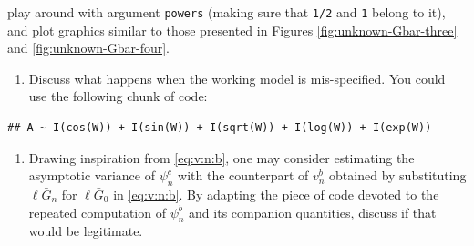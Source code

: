 \documentclass[]{article}
\newenvironment{Shaded}{\begin{snugshade}}{\end{snugshade}}
\newcommand{\ControlFlowTok}[1]{\textcolor[rgb]{0.13,0.29,0.53}{\textbf{#1}}}
\newcommand{\DataTypeTok}[1]{\textcolor[rgb]{0.13,0.29,0.53}{#1}}
\newcommand{\KeywordTok}[1]{\textcolor[rgb]{0.13,0.29,0.53}{\textbf{#1}}}
\newcommand{\NormalTok}[1]{#1}
\newcommand{\OperatorTok}[1]{\textcolor[rgb]{0.81,0.36,0.00}{\textbf{#1}}}
\newcommand{\OtherTok}[1]{\textcolor[rgb]{0.56,0.35,0.01}{#1}}
\newcommand{\StringTok}[1]{\textcolor[rgb]{0.31,0.60,0.02}{#1}}
\providecommand{\tightlist}{%
  \setlength{\itemsep}{0pt}\setlength{\parskip}{0pt}}
\newcommand{\Gbar}{\bar{G}}
\theoremstyle{definition}
\theoremstyle{definition}
\theoremstyle{definition}
\theoremstyle{remark}
\begin{document}
play around with argument \texttt{powers} (making sure that \texttt{1/2}
and \texttt{1} belong to it), and plot graphics similar to those
presented in Figures \ref{fig:unknown-Gbar-three} and
\ref{fig:unknown-Gbar-four}.

\begin{enumerate}
\def\labelenumi{\arabic{enumi}.}
\setcounter{enumi}{3}
\tightlist
\item
  Discuss what happens when the working model is mis-specified. You
  could use the following chunk of code:
\end{enumerate}

\begin{Shaded}
\end{Shaded}

\begin{verbatim}
## A ~ I(cos(W)) + I(sin(W)) + I(sqrt(W)) + I(log(W)) + I(exp(W))
\end{verbatim}

\begin{enumerate}
\def\labelenumi{\arabic{enumi}.}
\setcounter{enumi}{4}
\tightlist
\item
  \textdbend  Drawing inspiration from \eqref{eq:v:n:b}, one may
  consider estimating the asymptotic variance of \(\psi_{n}^{c}\) with
  the counterpart of \(v_{n}^{b}\) obtained by substituting
  \(\ell\Gbar_{n}\) for \(\ell\Gbar_{0}\) in \eqref{eq:v:n:b}. By
  adapting the piece of code devoted to the repeated computation of
  \(\psi_{n}^{b}\) and its companion quantities, discuss if that would
  be legitimate.
\end{enumerate}
\end{document}
